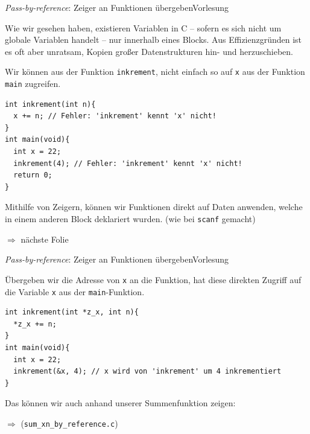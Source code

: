 \documentclass[xcolor=dvipsnames]{beamer}
\newcounter{lecturecounter}
\begin{document}
\begin{frame}[fragile]{\emph{Pass-by-reference}: Zeiger an Funktionen übergeben}{Vorlesung }
  \begin{block}{}
    Wie wir gesehen haben, existieren Variablen in C -- sofern es sich nicht um globale Variablen handelt -- nur innerhalb eines Blocks. Aus Effizienzgründen ist es oft aber unratsam, Kopien großer Datenstrukturen hin- und herzuschieben.
  \end{block}
  Wir können aus der Funktion \texttt{inkrement}, nicht einfach so auf \texttt{x} aus der Funktion \texttt{main} zugreifen.
  \begin{lstlisting}
int inkrement(int n){
  x += n; // Fehler: 'inkrement' kennt 'x' nicht!
}  
int main(void){
  int x = 22;
  inkrement(4); // Fehler: 'inkrement' kennt 'x' nicht!
  return 0;
} 
\end{lstlisting}
\vspace{-0.4cm}
  \begin{block}{}
    Mithilfe von Zeigern, können wir Funktionen direkt auf Daten anwenden, welche in einem anderen Block deklariert wurden. (wie bei \texttt{scanf} gemacht)
  \end{block}
  $\Rightarrow$  nächste Folie
\end{frame}

\begin{frame}[fragile]{\emph{Pass-by-reference}: Zeiger an Funktionen übergeben}{Vorlesung }
  \begin{block}{}
    Übergeben wir die Adresse von \texttt{x} an die Funktion, hat diese direkten Zugriff auf die Variable \texttt{x} aus der \texttt{main}-Funktion.
  \end{block}
  \begin{lstlisting}
int inkrement(int *z_x, int n){
  *z_x += n;
}  
int main(void){
  int x = 22;
  inkrement(&x, 4); // x wird von 'inkrement' um 4 inkrementiert
}
\end{lstlisting}
\vspace{-0.4cm}
  \begin{block}{}
    Das können wir auch anhand unserer Summenfunktion zeigen:
  \end{block}
  $\Rightarrow$ (\verb|sum_xn_by_reference.c|)
\end{frame}
\end{document}
